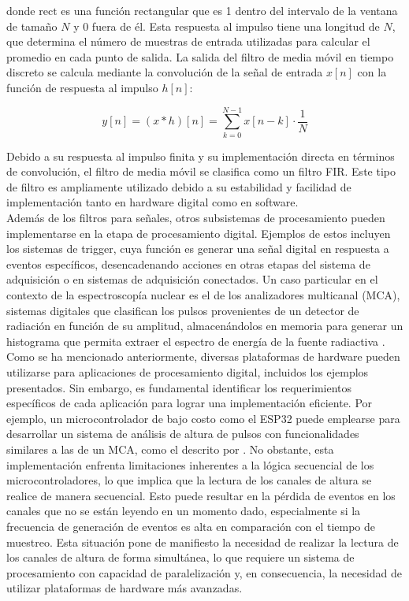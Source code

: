 \documentclass[]{book}
\begin{document}
\noindent donde \( \text{rect} \) es una función rectangular que es 1 dentro del intervalo de la ventana de tamaño \( N \) y 0 fuera de él. Esta respuesta al impulso tiene una longitud de \( N \), que determina el número de muestras de entrada utilizadas para calcular el promedio en cada punto de salida. La salida del filtro de media móvil en tiempo discreto se calcula mediante la convolución de la señal de entrada \( x[n] \) con la función de respuesta al impulso \( h[n] \):

\begin{equation}
    y[n] = (x * h)[n] = \sum_{k=0}^{N-1} x[n-k] \cdot \frac{1}{N}
\end{equation}

\noindent Debido a su respuesta al impulso finita y su implementación directa en términos de convolución, el filtro de media móvil se clasifica como un filtro FIR. Este tipo de filtro es ampliamente utilizado debido a su estabilidad y facilidad de implementación tanto en hardware digital como en software.\\

\noindent Además de los filtros para señales, otros subsistemas de procesamiento pueden implementarse en la etapa de procesamiento digital. Ejemplos de estos incluyen los sistemas de trigger, cuya función es generar una señal digital en respuesta a eventos específicos, desencadenando acciones en otras etapas del sistema de adquisición o en sistemas de adquisición conectados. Un caso particular en el contexto de la espectroscopía nuclear es el de los analizadores multicanal (MCA), sistemas digitales que clasifican los pulsos provenientes de un detector de radiación en función de su amplitud, almacenándolos en memoria para generar un histograma que permita extraer el espectro de energía de la fuente radiactiva \cite{knoll2010radiation}.\\

\noindent Como se ha mencionado anteriormente, diversas plataformas de hardware pueden utilizarse para aplicaciones de procesamiento digital, incluidos los ejemplos presentados. Sin embargo, es fundamental identificar los requerimientos específicos de cada aplicación para lograr una implementación eficiente. Por ejemplo, un microcontrolador de bajo costo como el ESP32 puede emplearse para desarrollar un sistema de análisis de altura de pulsos con funcionalidades similares a las de un MCA, como el descrito por \cite{ramirez2024}. No obstante, esta implementación enfrenta limitaciones inherentes a la lógica secuencial de los microcontroladores, lo que implica que la lectura de los canales de altura se realice de manera secuencial. Esto puede resultar en la pérdida de eventos en los canales que no se están leyendo en un momento dado, especialmente si la frecuencia de generación de eventos es alta en comparación con el tiempo de muestreo. Esta situación pone de manifiesto la necesidad de realizar la lectura de los canales de altura de forma simultánea, lo que requiere un sistema de procesamiento con capacidad de paralelización y, en consecuencia, la necesidad de utilizar plataformas de hardware más avanzadas.\\
\end{document}
